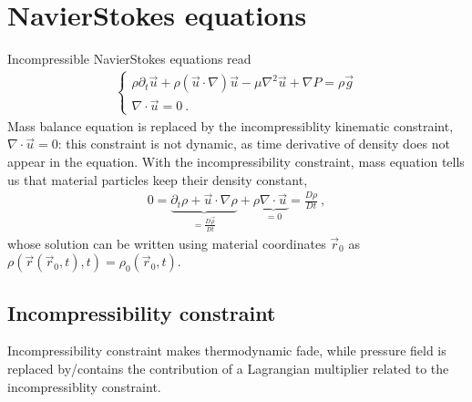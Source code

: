 \documentclass[letterpaper,10pt,english]{jupyterBook}
\begin{document}
\sphinxstepscope


\chapter{Navier\sphinxhyphen{}Stokes equations}
\label{\detokenize{ch/pde/ns:navier-stokes-equations}}\label{\detokenize{ch/pde/ns:pde-ns}}\label{\detokenize{ch/pde/ns::doc}}
\sphinxAtStartPar
Incompressible Navier\sphinxhyphen{}Stokes equations read
\begin{equation*}
\begin{split}\begin{cases}
  \rho \partial_t \vec{u} + \rho \left( \vec{u} \cdot \nabla \right) \vec{u} - \mu \nabla^2 \vec{u} + \nabla P = \rho \vec{g} \\
  \nabla \cdot \vec{u} = 0 \ . 
\end{cases}\end{split}
\end{equation*}
\sphinxAtStartPar
Mass balance equation is replaced by the incompressiblity kinematic constraint, \(\nabla \cdot \vec{u} = 0\): this constraint is not dynamic, as time derivative of density does not appear in the equation. With the incompressibility constraint, mass equation tells us that material particles keep their density constant,
\begin{equation*}
\begin{split}0 = \underbrace{\partial_t \rho + \vec{u} \cdot \nabla \rho}_{=\frac{D \vec{\rho}}{D t}} + \rho \underbrace{\nabla \cdot \vec{u}}_{=0} = \frac{D \rho}{D t} \ , \end{split}
\end{equation*}
\sphinxAtStartPar
whose solution can be written using material coordinates \(\vec{r}_0\) as \(\rho(\vec{r}(\vec{r}_0,t), t) = \rho_0(\vec{r}_0, t)\).


\section{Incompressibility constraint}
\label{\detokenize{ch/pde/ns:incompressibility-constraint}}
\sphinxAtStartPar
Incompressibility constraint makes thermodynamic fade, while pressure field is replaced by/contains the contribution of a Lagrangian multiplier related to the incompressiblity constraint.
\end{document}
